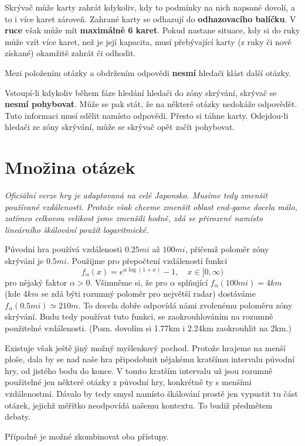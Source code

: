 \documentclass{book}
\newenvironment{reasoning}{\begin{small}\itshape}{\end{small}}
\begin{document}
Skrývač může karty zahrát kdykoliv, kdy to podmínky na nich napsané dovolí, a to i více karet zároveň. Zahrané karty se odhazují do \textbf{odhazovacího balíčku}. V \textbf{ruce} však může mít \textbf{maximálně 6 karet}. Pokud nastane situace, kdy si do ruky může vzít více karet, než je její kapacita, musí přebývající karty (z ruky či nově získané) okamžitě zahrát či odhodit.

Mezi položením otázky a obdržením odpovědi \textbf{nesmí} hledači klást další otázky.

Vstoupí-li kdykoliv během fáze hledání hledači do zóny skrývání, skrývač se \textbf{nesmí pohybovat}. Může se pak stát, že na některé otázky nedokáže odpovědět. Tuto informaci musí sdělit namísto odpovědi. Přesto si táhne karty. Odejdou-li hledači ze zóny skrývání, může se skrývač opět začít pohybovat.

\section{Množina otázek}\label{otázky}

\begin{reasoning}
	Oficiální verze hry je adaptovaná na celé Japonsko. Musíme tedy zmenšit používané vzdálenosti. Protože však chceme zmenšit oblast end-game docela málo, zatímco celkovou velikost jsme zmenšili hodně, zdá se přirozené namísto lineárního škálování použít logaritmické.

	Původní hra používá vzdálenosti $0.25mi$ až $100mi$, přičemž poloměr zóny skrývání je $0.5mi$. Použijme pro přepočtení vzdáleností funkci
	\begin{equation*}
		f_\alpha(x) = e^{\alpha\log(1+x)} - 1,\quad x \in [0, \infty)
	\end{equation*}
	pro nějaký faktor $\alpha > 0$. Všimněme si, že pro $\alpha$ splňující $f_\alpha(100mi) = 4km$ (kde $4km$ se zdá býti rozumný poloměr pro největší radar) dostáváme $f_\alpha(0.5mi) \simeq 210m$. To docela dobře odpovídá námi zvolenému poloměru zóny skrývání. Budu tedy používat tuto funkci, se zaokrouhlováním na rozumně použitelné vzdálenosti. (Pozn. dovolím si 1.77km i 2.24km zaokrouhlit na 2km.)

	Existuje však ještě jiný možný myšlenkový pochod. Protože hrajeme na menší ploše, dala by se nad naše hra připodobnit nějakému kratšímu intervalu původní hry, od jistého bodu do konce. V tomto kratším intervalu už jsou rozumně použitelné jen některé otázky z původní hry, konkrétně ty s menšími vzdálenostmi. Dávalo by tedy smysl namísto škálování prostě jen vypustit tu část otázek, jejichž měřítko neodpovídá našemu kontextu. To budiž předmětem debaty.

	Případně je možné zkombinovat oba přístupy.
\end{reasoning}
\end{document}
